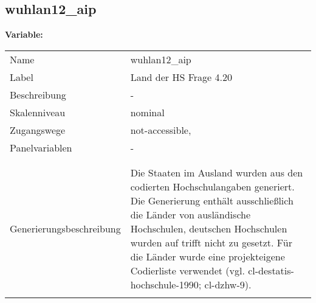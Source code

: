 	
	
	\subsection{wuhlan12\_aip}
	\label{subSection:wuhlan12_aip}

	\noindent\textbf{Variable:}\\
		\begin{tabular}{lL{11.3cm}}
			\label{tableVariable:wuhlan12_aip}
			Name & wuhlan12\_aip \\
			Label & Land der HS Frage 4.20 \\
			Beschreibung & - \\
			Skalenniveau & nominal \\
			Zugangswege &
				not-accessible,
 \\
			Panelvariablen & -
			 \\
			 \\
 \\
					Generierungsbeschreibung & Die Staaten im Ausland wurden aus den codierten Hochschulangaben generiert. Die Generierung enthält ausschließlich die Länder von ausländische Hochschulen, deutschen Hochschulen wurden auf trifft nicht zu gesetzt. Für die Länder wurde eine projekteigene Codierliste verwendet (vgl. cl-destatis-hochschule-1990; cl-dzhw-9).
				 \\	
			 \\
		\end{tabular}






	
	\newpage
